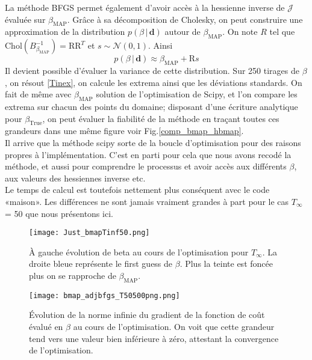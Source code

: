 \documentclass[a4paper,12pt]{article}
\newcommand{\bepar}[1]{
	\left( #1 \right)  
}
\newcommand{\bmap}{\beta_{\text{MAP}}}
\newcommand{\J}{\mathcal{J}}
\newcommand{\tinf}{$T_\infty$}
\numberwithin{equation}{section} %
\begin{document}
\noindent La méthode BFGS permet également d'avoir accès à la hessienne inverse de $\J$ évaluée sur $\bmap$. Grâce à sa décomposition de Cholesky, on peut construire une approximation de la distribution $p\bepar{\beta\,|\,\textbf{d}}$ autour de $\bmap$. 
On note $R$ tel que $\text{Chol}\bepar{B_{\bmap}^{-1}} = \text{R}\text{R}^T$ et $s \sim \mathcal{N}\bepar{0,1}$. Ainsi 
\begin{equation}
p\bepar{\beta\,|\,\textbf{d}} \approx \bmap + \text{R}s \label{distribbmap}
\end{equation}
Il devient possible d'évaluer la variance de cette distribution. Sur 250 tirages de $\beta$, on résout \eqref{Tinex}, on calcule les extrema ainsi que les déviations standards. On fait de même avec $\bmap$ solution de l'optimisation de Scipy, et l'on compare les extrema sur chacun des points du domaine; disposant d'une écriture analytique pour $\beta_{\text{True}}$, on peut évaluer la fiabilité de la méthode en traçant toutes ces grandeurs dans une même figure voir Fig.\eqref{comp_bmap_hbmap}. \\
 Il arrive que la méthode scipy sorte de la boucle d'optimisation pour des raisons propres à l'implémentation. C'est en parti pour cela que nous avons recodé la méthode, et aussi pour comprendre le processus et avoir accès aux différents $\beta$, aux valeurs des hessiennes inverse etc.\\
 Le temps de calcul est toutefois nettement plus conséquent avec le code «maison». Les différences ne sont jamais vraiment grandes à part pour le cas \tinf = 50 que nous présentons ici. 

\begin{figure}[!ht]
\centering
\texttt{[image: Just\_bmapTinf50.png]}
\caption{\small{À gauche évolution de beta au cours de l'optimisation pour $T_\infty$. La droite bleue représente le first guess de $\beta$. Plus la teinte est foncée plus on se rapproche de $\bmap$.}}
\label{tinf50cpt_500}
\end{figure}

\begin{figure}[!ht]
\centering
\texttt{[image: bmap\_adjbfgs\_T50500png.png]}
\caption{\small{Évolution de la norme infinie du gradient de la fonction de coût évalué en $\beta$ au cours de l'optimisation. On voit que cette grandeur tend vers une valeur bien inférieure à zéro, attestant la convergence de l'optimisation.}}
\label{evolT50}
\end{figure}
\end{document}

